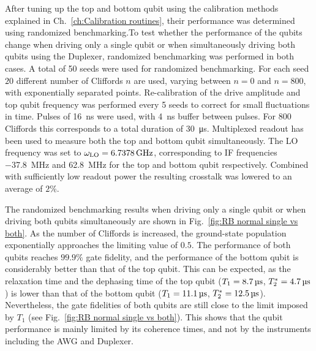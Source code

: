         After tuning up the top and bottom qubit using the calibration methods explained in Ch.~\ref{ch:Calibration routines}, their performance was determined using randomized benchmarking.To test whether the performance of the qubits change when driving only a single qubit or when simultaneously driving both qubits using the Duplexer, randomized benchmarking was performed in both cases. A total of 50 seeds were used for randomized benchmarking. For each seed $20$ different number of Cliffords $n$ are used, varying between $n=0$ and $n=800$, with exponentially separated points. Re-calibration of the drive amplitude and top qubit frequency was performed every 5 seeds to correct for small fluctuations in time. Pulses of \SI{16}{\nano \second} were used, with \SI{4}{\nano \second} buffer between pulses. For $800$ Cliffords this corresponds to a total duration of \SI{30}{\micro \second}. Multiplexed readout has been used to measure both the top and bottom qubit simultaneously. The LO frequency was set to $\omega_\text{LO}=\text{\ensuremath{\SI{6.7378}{\giga \hertz}}}$, corresponding to IF frequencies \SI{-37.8}{\mega \hertz} and \SI{62.8}{\mega \hertz} for the top and bottom qubit respectively. Combined with sufficiently low readout power the resulting crosstalk was lowered to an average of $2\%$.

        The randomized benchmarking results when driving only a single qubit or when driving both qubits simultaneously are shown in Fig.~\ref{fig:RB normal single vs both}. As the number of Cliffords is increased, the ground-state population exponentially approaches the limiting value of $0.5$. The performance of both qubits reaches $99.9\%$ gate fidelity, and the performance of the bottom qubit is considerably better than that of the top qubit.  This can be expected, as the relaxation time and the dephasing time of the top qubit ($T_1 = \text{\ensuremath{\SI{8.7}{\micro \second}}}$, $T_2^*=\text{\ensuremath{\SI{4.7}{\micro \second}}}$) is lower than that of the bottom qubit ($T_1 = \text{\ensuremath{\SI{11.1}{\micro \second}}}$, $T_2^*=\text{\ensuremath{\SI{12.5}{\micro \second}}}$). Nevertheless, the gate fidelities of both qubits are still close to the limit imposed by $T_1$ (see Fig.~\ref{fig:RB normal single vs both}). This shows that the qubit performance is mainly limited by its coherence times, and not by the instruments including the AWG and Duplexer.


